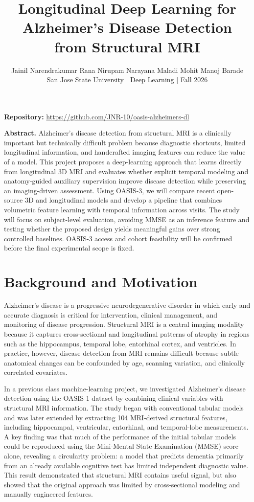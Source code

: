 \documentclass[11pt]{article}
\title{\vspace{-1.0cm}\textbf{Longitudinal Deep Learning for Alzheimer's Disease Detection from Structural MRI}}
\author{Jainil Narendrakumar Rana \quad Nirupam Narayana Maladi \quad Mohit Manoj Barade\\[3pt]
San Jose State University \quad | \quad Deep Learning \quad | \quad Fall 2026}
\date{}
\begin{document}
\maketitle
\vspace{-0.5cm}

\begin{center}
\small\textbf{Repository:} \url{https://github.com/JNR-10/oasis-alzheimers-dl}
\end{center}

\textbf{Abstract.}
Alzheimer's disease detection from structural MRI is a clinically important but technically difficult problem because diagnostic shortcuts, limited longitudinal information, and handcrafted imaging features can reduce the value of a model. This project proposes a deep-learning approach that learns directly from longitudinal 3D MRI and evaluates whether explicit temporal modeling and anatomy-guided auxiliary supervision improve disease detection while preserving an imaging-driven assessment. Using OASIS-3, we will compare recent open-source 3D and longitudinal models and develop a pipeline that combines volumetric feature learning with temporal information across visits. The study will focus on subject-level evaluation, avoiding MMSE as an inference feature and testing whether the proposed design yields meaningful gains over strong controlled baselines. OASIS-3 access and cohort feasibility will be confirmed before the final experimental scope is fixed.

\section{Background and Motivation}

Alzheimer's disease is a progressive neurodegenerative disorder in which early and accurate diagnosis is critical for intervention, clinical management, and monitoring of disease progression. Structural MRI is a central imaging modality because it captures cross-sectional and longitudinal patterns of atrophy in regions such as the hippocampus, temporal lobe, entorhinal cortex, and ventricles. In practice, however, disease detection from MRI remains difficult because subtle anatomical changes can be confounded by age, scanning variation, and clinically correlated covariates.

In a previous class machine-learning project, we investigated Alzheimer's disease detection using the OASIS-1 dataset by combining clinical variables with structural MRI information. The study began with conventional tabular models and was later extended by extracting 104 MRI-derived structural features, including hippocampal, ventricular, entorhinal, and temporal-lobe measurements. A key finding was that much of the performance of the initial tabular models could be reproduced using the Mini-Mental State Examination (MMSE) score alone, revealing a circularity problem: a model that predicts dementia primarily from an already available cognitive test has limited independent diagnostic value. This result demonstrated that structural MRI contains useful signal, but also showed that the original approach was limited by cross-sectional modeling and manually engineered features.
\end{document}
